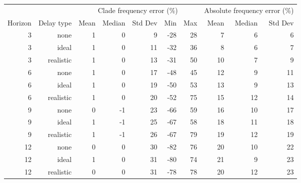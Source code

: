 
\begin{tabular*}{1.0\textwidth}{rrrrrrrrrr}
\toprule
        &            & \multicolumn{5}{c}{Clade frequency error (\%)} & \multicolumn{3}{c}{Absolute frequency error (\%)} \\
Horizon & Delay type & Mean & Median & Std Dev & Min & Max & Mean & Median & Std Dev \\
\midrule

3 & none & 1 & 0 & 9 & -28 & 28 & 7 & 6 & 6 \\
3 & ideal & 1 & 0 & 11 & -32 & 36 & 8 & 6 & 7 \\
3 & realistic & 1 & 0 & 13 & -31 & 50 & 10 & 7 & 9 \\
6 & none & 1 & 0 & 17 & -48 & 45 & 12 & 9 & 11 \\
6 & ideal & 1 & 0 & 19 & -50 & 53 & 13 & 9 & 13 \\
6 & realistic & 1 & 0 & 20 & -52 & 75 & 15 & 12 & 14 \\
9 & none & 0 & -1 & 23 & -66 & 59 & 16 & 10 & 17 \\
9 & ideal & 1 & -1 & 25 & -67 & 58 & 18 & 11 & 18 \\
9 & realistic & 1 & -1 & 26 & -67 & 79 & 19 & 12 & 19 \\
12 & none & 0 & 0 & 30 & -82 & 76 & 20 & 10 & 22 \\
12 & ideal & 1 & 0 & 31 & -80 & 74 & 21 & 9 & 23 \\
12 & realistic & 0 & 0 & 31 & -78 & 78 & 20 & 12 & 23 \\

\bottomrule
\end{tabular*}


